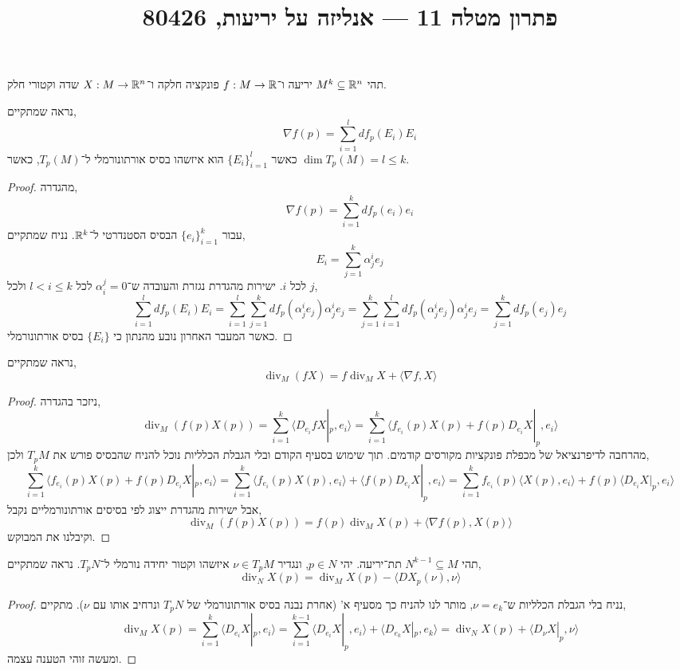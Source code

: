 
\title{פתרון מטלה 11 --- אנליזה על יריעות, 80426}

\DeclareMathOperator{\vol}{vol}
\DeclareMathOperator{\Div}{div}


\maketitle
\maketitleprint[blue]

\question{}
תהי $M^k \subseteq \mathbb{R}^n$ יריעה ו־$f : M \to \mathbb{R}$ פונקציה חלקה ו־$X : M \to \mathbb{R}^n$ שדה וקטורי חלק.

\subquestion{}
נראה שמתקיים,
\[
	\nabla f(p)
	= \sum_{i = 1}^l df_p(E_i) E_i
\]
כאשר ${\{ E_i \}}_{i = 1}^l$ הוא איזשהו בסיס אורתונורמלי ל־$T_p(M)$, כאשר $\dim T_p(M) = l \le k$.
\begin{proof}
	מהגדרה,
	\[
		\nabla f(p)
		= \sum_{i = 1}^k df_p(e_i) e_i
	\]
	עבור ${\{ e_i \}}_{i = 1}^k$ הבסיס הסטנדרטי ל־$\mathbb{R}^k$.
	נניח שמתקיים,
	\[
		E_i = \sum_{j = 1}^k \alpha_j^i e_j
	\]
	לכל $i$.
	ישירות מהגדרת נגזרת והעובדה ש־$\alpha_i^j = 0$ לכל $l < i \le k$ ולכל $j$,
	\[
		\sum_{i = 1}^l df_p(E_i) E_i
		= \sum_{i = 1}^l \sum_{j = 1}^k df_p(\alpha_j^i e_j) \alpha_j^i e_j
		= \sum_{j = 1}^k \sum_{i = 1}^l df_p(\alpha_j^i e_j) \alpha_j^i e_j
		= \sum_{j = 1}^k df_p(e_j) e_j
	\]
	כאשר המעבר האחרון נובע מהנתון כי $\{ E_i \}$ בסיס אורתונורמלי.
\end{proof}

\subquestion{}
נראה שמתקיים,
\[
	\Div_M(f X)
	= f \Div_M X + \langle \nabla f, X \rangle
\]
\begin{proof}
	ניזכר בהגדרה,
	\[
		\Div_M(f(p) X(p))
		= \sum_{i = 1}^k \langle D_{e_i} f X |_p, e_i \rangle
		= \sum_{i = 1}^k \langle f_{e_i}(p) X(p) + f(p) D_{e_i} X |_p, e_i \rangle
	\]
	מהרחבה לדיפרנציאל של מכפלת פונקציות מקורסים קודמים.
	תוך שימוש בסעיף הקודם ובלי הגבלת הכלליות נוכל להניח שהבסיס פורש את $T_p M$ ולכן,
	\[
		\sum_{i = 1}^k \langle f_{e_i}(p) X(p) + f(p) D_{e_i} X |_p, e_i \rangle
		= \sum_{i = 1}^k \langle f_{e_i}(p) X(p), e_i \rangle + \langle f(p) D_{e_i} X |_p, e_i \rangle
		= \sum_{i = 1}^k f_{e_i}(p) \langle X(p), e_i \rangle + f(p) \langle D_{e_i} X |_p, e_i \rangle
	\]
	אבל ישירות מהגדרת ייצוג לפי בסיסים אורתונורמליים נקבל,
	\[
		\Div_M(f(p) X(p))
		= f(p) \Div_M X(p) + \langle \nabla f(p), X(p) \rangle
	\]
	וקיבלנו את המבוקש.
\end{proof}

\subquestion{}
תהי $N^{k - 1} \subseteq M$ תת־יריעה.
יהי $p \in N$, ונגדיר $\nu \in T_p M$ איזשהו וקטור יחידה נורמלי ל־$T_p N$.
נראה שמתקיים,
\[
	\Div_N X(p)
	= \Div_M X(p) - \langle D X_p(\nu), \nu \rangle
\]
\begin{proof}
	נניח בלי הגבלת הכלליות ש־$\nu = e_k$, מותר לנו להניח כך מסעיף א' (אחרת נבנה בסיס אורתונורמלי של $T_p N$ ונרחיב אותו עם $\nu$).
	מתקיים,
	\[
		\Div_M X(p)
		= \sum_{i = 1}^k \langle D_{e_i} X |_p, e_i \rangle
		= \sum_{i = 1}^{k - 1} \langle D_{e_i} X |_p, e_i \rangle + \langle D_{e_k} X |_p, e_k \rangle 
		= \Div_N X(p) + \langle D_{\nu} X |_p, \nu \rangle 
	\]
	ומעשה זוהי הטענה עצמה.
\end{proof}

